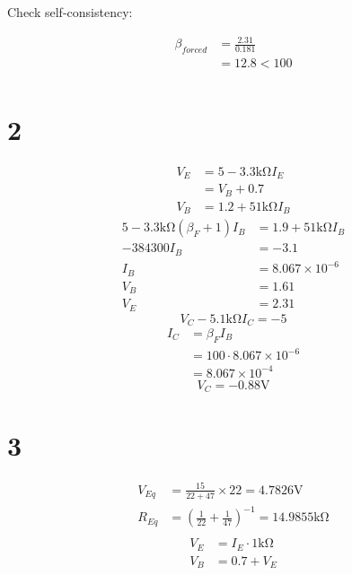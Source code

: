 \documentclass{article}
\begin{document}
\begin{multicols}{2}
    Check self-consistency:

    \begin{align*}
        \beta_{forced} & = \frac{2.31}{0.181} \\
                       & = 12.8 < 100
    \end{align*}
    \begin{align*}
    \end{align*}

    \section*{2}
    \begin{align*}
        V_E & = 5-3.3\si{\kilo\ohm} I_E      \\
            & = V_B + 0.7                    \\
        V_B & = 1.2 + 51 \si{\kilo \ohm} I_B
    \end{align*}
    \begin{align*}
        5-3.3\si{\kilo\ohm} \left(\beta_F + 1\right) I_B & = 1.9 + 51 \si{\kilo\ohm} I_B \\
        -384300 I_B                                      & = -3.1                        \\
        I_B                                              & = 8.067 \times 10^{-6}        \\
        V_B                                              & \boxed{= 1.61}                \\
        V_E                                              & \boxed{= 2.31}
    \end{align*}
    \[
        V_C -5.1 \si{\kilo\ohm} I_C = -5
    \]
    \begin{align*}
        I_C & = \beta_F I_B                    \\
            & = 100 \cdot 8.067 \times 10^{-6} \\
            & = 8.067 \times 10^{-4}
    \end{align*}
    \[
        V_C = \boxed{-0.88 \si{\volt}}
    \]

    \section*{3}
    \begin{align*}
        V_{Eq} & = \frac{15}{22+47} \times 22 = 4.7826 \si{\volt}                          \\
        R_{Eq} & = {\left(\frac{1}{22}+\frac{1}{47} \right)}^{-1} = 14.9855 \si{\kilo\ohm} \\
    \end{align*}
    \begin{align*}
        V_E & = I_E \cdot 1 \si{\kilo\ohm} \\
        V_B & = 0.7 + V_E
    \end{align*}


\end{multicols}
\end{document}
